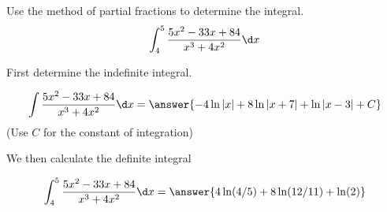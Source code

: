 \documentclass{ximera}
\author{Jason Miller}
\begin{document}
\begin{exercise}
Use the method of partial fractions to determine the integral.
\[
\int_{4}^{5} \frac{5x^{2}-33x+84}{x^{3}+4x^{2}} \d x
\]

First determine the indefinite integral.

\[
\int \frac{5x^{2}-33x+84}{x^{3}+4x^{2}} \d x=\answer{    -4\ln|x| +8\ln|x+7|+\ln|x-3| +C   } 
\]
(Use $C$ for the constant of integration)


\begin{exercise}

We then calculate the definite integral 

\[
\int_{4}^{5} \frac{5x^{2}-33x+84}{x^{3}+4x^{2} }\d x=\answer{ 4\ln(4/5)+8\ln(12/11)+\ln(2) }
\]

\end{exercise}
\end{exercise}
\end{document}
